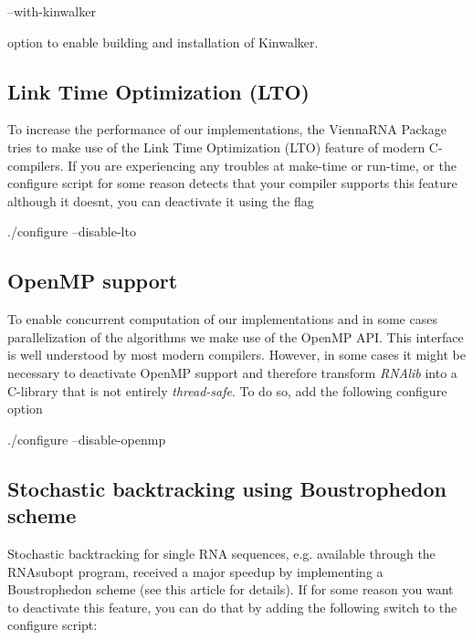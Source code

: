 \begin{DoxyVerb}--with-kinwalker
\end{DoxyVerb}


option to enable building and installation of Kinwalker.\hypertarget{install_config_lto}{}\subsection{Link Time Optimization (\+L\+T\+O)}\label{install_config_lto}
To increase the performance of our implementations, the Vienna\+R\+NA Package tries to make use of the Link Time Optimization (L\+TO) feature of modern C-\/compilers. If you are experiencing any troubles at make-\/time or run-\/time, or the configure script for some reason detects that your compiler supports this feature although it doesn\textquotesingle{}t, you can deactivate it using the flag

\begin{DoxyVerb}./configure --disable-lto
\end{DoxyVerb}
\hypertarget{install_config_openmp}{}\subsection{Open\+M\+P support}\label{install_config_openmp}
To enable concurrent computation of our implementations and in some cases parallelization of the algorithms we make use of the Open\+MP A\+PI. This interface is well understood by most modern compilers. However, in some cases it might be necessary to deactivate Open\+MP support and therefore transform {\itshape R\+N\+Alib} into a C-\/library that is not entirely {\itshape thread-\/safe}. To do so, add the following configure option

\begin{DoxyVerb}./configure --disable-openmp
\end{DoxyVerb}
\hypertarget{install_config_boustrophedon}{}\subsection{Stochastic backtracking using Boustrophedon scheme}\label{install_config_boustrophedon}
Stochastic backtracking for single R\+NA sequences, e.\+g. available through the R\+N\+Asubopt program, received a major speedup by implementing a Boustrophedon scheme (see this article for details). If for some reason you want to deactivate this feature, you can do that by adding the following switch to the configure script\+:

